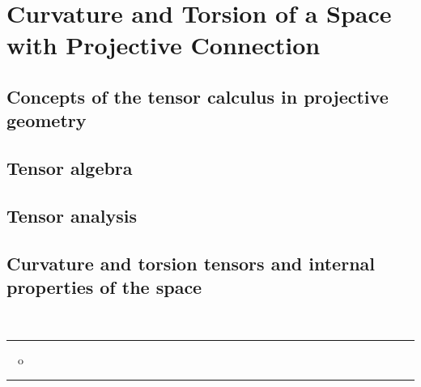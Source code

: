 
\chapter{Curvature and Torsion of a Space with Projective Connection}


\section{Concepts of the tensor calculus in projective geometry}
             






\section{Tensor algebra}







\section{Tensor analysis}

%
%
%
%
%


\section{Curvature and torsion tensors and internal properties of the space}

%
%
%
%
%


\ \\[.5cm]
\begin{center}
\rule{2cm}{.03cm} \ \ o \ \ \rule{2cm}{.03cm} 
\end{center} 


%





























